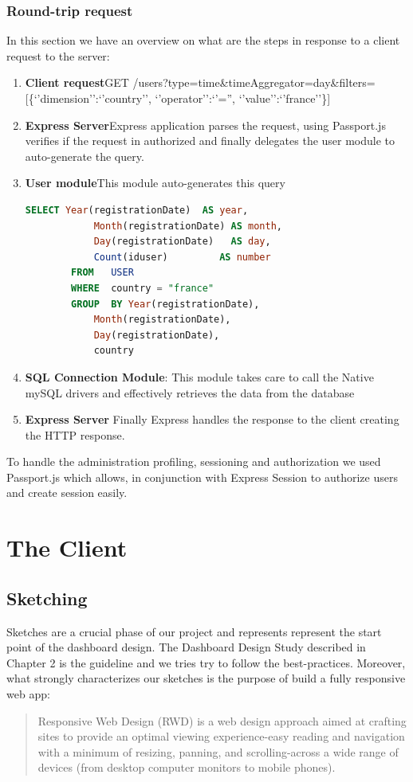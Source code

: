 \documentclass[a4paper,13pt]{report}
\begin{document}
    \subsection{Round-trip request}
    In this section we have an overview on what are the steps in response to a client request to the server:
    \begin{enumerate}
        \item \textbf{Client request}\newline GET /users?type=time\&timeAggregator=day\&filters=[\{`'dimension'':`'country'', `'operator'':`'='', `'value'':`'france''\}] 
        \item \textbf{Express Server}\newline Express application parses the request, using Passport.js verifies if the request in authorized and finally delegates the user module to auto-generate the query.
        \item \textbf{User module}\newline This module auto-generates this query 
        \begin{lstlisting}[language=SQL]
        SELECT Year(registrationDate)  AS year, 
            Month(registrationDate) AS month, 
            Day(registrationDate)   AS day, 
            Count(iduser)         AS number 
        FROM   USER 
        WHERE  country = "france" 
        GROUP  BY Year(registrationDate), 
            Month(registrationDate), 
            Day(registrationDate), 
            country 
        \end{lstlisting}
        \item \textbf{SQL Connection Module}:
            This module takes care to call the Native mySQL drivers and effectively retrieves the data from the database
        \item  \textbf{Express Server}
            Finally Express handles the response to the client creating the HTTP response.
    \end{enumerate}


    To handle the administration profiling, sessioning and authorization we used Passport.js which allows, in conjunction with Express Session to authorize users and create session easily.
\chapter{The Client}
 \section{Sketching}
Sketches are a crucial phase of our project and represents represent the start point of the dashboard design. The Dashboard Design Study described in Chapter 2 is the guideline and we tries try to follow the best-practices.
Moreover, what strongly characterizes our sketches is the purpose of build a fully responsive web app: 
\begin{quote} 
    Responsive Web Design (RWD) is a web design approach aimed at crafting sites to provide an optimal viewing experience-easy reading and navigation with a minimum of resizing, panning, and scrolling-across a wide range of devices (from desktop computer monitors to mobile phones).
\end{quote}
\end{document}
